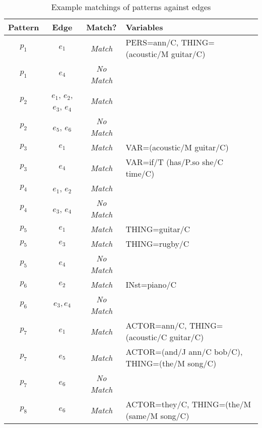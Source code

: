 \documentclass[11pt]{scrreprt}
\begin{document}
\begin{table}[ht]
\centering
\begin{tabular}{cccl}
\toprule
\textbf{Pattern} & \textbf{Edge} & \textbf{Match?} & \textbf{Variables} \\
\midrule
\(p_1\) & \(e_1\) & \textit{Match} & \textsf{PERS=ann/C, THING=(acoustic/M guitar/C)} \\
\(p_1\) & \(e_4\) & \textit{No Match} & \\
\(p_2\) & \(e_1\), \(e_2\), \(e_3\), \(e_4\) & \textit{Match} & \\
\(p_2\) & \(e_5\), \(e_6\) & \textit{No Match} & \\
\(p_3\) & \(e_1\) & \textit{Match} & \textsf{VAR=(acoustic/M guitar/C)} \\
\(p_3\) & \(e_4\) & \textit{Match} & \textsf{VAR=if/T (has/P.so she/C time/C)} \\
\(p_4\) & \(e_1\), \(e_2\) & \textit{Match} & \\
\(p_4\) & \(e_3\), \(e_4\)  & \textit{No Match} & \\
\(p_5\) & \(e_1\)  & \textit{Match} & \textsf{THING=guitar/C} \\
\(p_5\) & \(e_3\)  & \textit{Match} & \textsf{THING=rugby/C} \\
\(p_5\) & \(e_4\)  & \textit{No Match} & \\
\(p_6\) & \(e_2\)  & \textit{Match} & \textsf{IN\gls{st}=piano/C} \\
\(p_6\) & \(e_3, e_4\)  & \textit{No Match} & \\
\(p_7\) & \(e_1\)  & \textit{Match} & \textsf{ACTOR=ann/C, THING=(acoustic/C guitar/C)}\\
\(p_7\) & \(e_5\)  & \textit{Match} & \textsf{ACTOR=(and/J ann/C bob/C), THING=(the/M song/C)}\\
\(p_7\) & \(e_6\)  & \textit{No Match} & \\
\(p_8\) & \(e_6\)  & \textit{Match} & \textsf{ACTOR=they/C, THING=(the/M (same/M song/C)}\\
\bottomrule
\end{tabular}
\caption{Example matchings of patterns against edges}
\label{tab:shpl-example-matchings}
\vspace{2\baselineskip}
\end{table}
\end{document}
